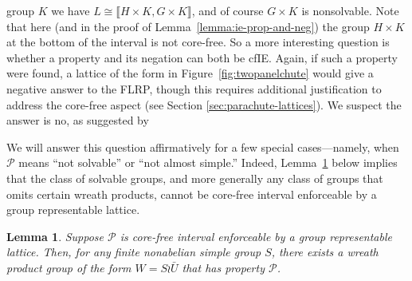 \documentclass{gen-j-l}
\newcommand{\lb}{\ensuremath{\llbracket}}
\newcommand{\rb}{\ensuremath{\rrbracket}}
\newcommand{\<}{\ensuremath{\langle}}
\renewcommand{\>}{\ensuremath{\rangle}}
\theoremstyle{plain}
\newtheorem{lemma}[theorem]{Lemma}
\theoremstyle{definition}
\newcounter{prob}
\newtheorem{prob}[prob]{Problem}
\theoremstyle{remark}
\numberwithin{theorem}{section}
\numberwithin{claim}{section}
\numberwithin{equation}{section}
\numberwithin{conjecture}{section}
\newcommand{\2}{\ensuremath{\mathbf{2}}}
\newcommand{\3}{\ensuremath{\mathbf{3}}}
\newcommand{\cP}{\ensuremath{\mathcal{P}}}
\begin{document}
group $K$ we have $L\cong \lb H\times K, G\times K \rb$, and of course $G\times K$ is
nonsolvable.  Note that here (and in the proof 
of Lemma~\ref{lemma:ie-prop-and-neg}) the group $H\times K$ at the bottom of
the interval is not core-free.  So a more interesting question is whether a
property and its negation can both be \acs{cfIE}.  Again, if such a property were
found, a lattice of the form in Figure~\ref{fig:twopanelchute} would give a
negative answer to the \acs{FLRP}, though this requires additional justification to address
the core-free aspect (see Section \ref{sec:parachute-lattices}).  
We suspect the answer is no, as suggested by

We will answer this question affirmatively for a few special cases---namely,
when $\cP$ means ``not solvable'' or ``not almost simple.'' Indeed, 
Lemma~\ref{lem:IE-must-have-wreaths} below implies that the class of solvable
groups, and more generally any class of groups that omits certain wreath
products, cannot be core-free interval enforceable by a group representable
lattice. 

\begin{lemma}
  \label{lem:IE-must-have-wreaths}
Suppose $\cP$ is core-free interval enforceable by a group
representable lattice.   
Then, for any finite nonabelian simple group $S$, there exists a wreath product group
of the form $W = S\wr \bar{U}$ that has property $\cP$.
\end{lemma}
\end{document}
